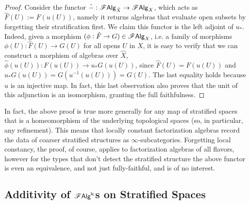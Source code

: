 \documentclass[../text.tex]{subfiles}
\begin{document}
\begin{proof}
    Consider the functor $\hat{-}: \mathscr{F} \mathsf{Alg}_{\hat{X}} \rightarrow \mathscr{F} \mathsf{Alg}_{X}$, which acts as $\hat{F}(U) := F(u(U))$, namely it returns algebras that evaluate open subsets by forgetting their stratification first. We claim this functor is the left adjoint of $u_*$. Indeed, given a morphism $(\phi: \hat{F} \rightarrow G) \in \mathscr{F} \mathsf{Alg}_{X}$, i.e. a family of morphisms $\phi(U): \hat{F}(U) \rightarrow G(U)$ for all opens $U$ in $X$, it is easy to verify that we can construct a morphism of algebras over $\hat{X}$, $\hat{\phi}(u(U)): F(u(U)) \rightarrow u_*G (u(U))$, since $\hat{F}(U) = F(u(U))$ and $u_*G(u(U)) = G(u^{-1}(u(U))) = G(U)$. The last equality holds because $u$ is an injective map. In fact, this last observation also proves that the unit of this adjunction is an isomorphism, granting the full faithfulness.
\end{proof}

\begin{remark}
    In fact, the above proof is true more generally for any map of stratified spaces that is a homeomorphism of the underlying topological spaces (so, in particular, any refinement). This means that locally constant factorization algebras record the data of coarser stratified structures as $\infty$-subcategories. Forgetting local constancy, the proof, of course, applies to factorization algebras of all flavors, however for the types that don't detect the stratified structure the above functor is even an equivalence, and not just fully-faithful, and is of no interest.
\end{remark}


\subsection{Additivity of \texorpdfstring{$\mathscr{F} \mathsf{Alg}^{\mathsf{lc}}$}{lcfa}s on Stratified Spaces}
\end{document}
